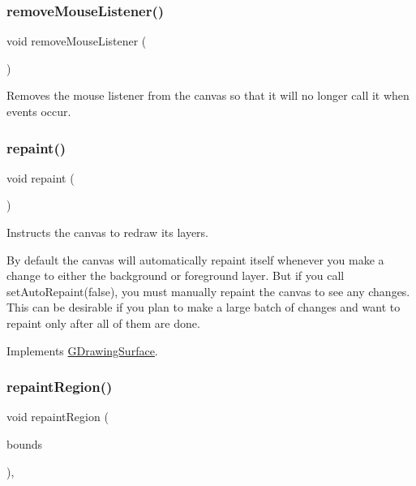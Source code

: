 \subsubsection{\texorpdfstring{remove\+Mouse\+Listener()}{removeMouseListener()}}
{\footnotesize\ttfamily void remove\+Mouse\+Listener (\begin{DoxyParamCaption}{ }\end{DoxyParamCaption})\hspace{0.3cm}{\ttfamily [virtual]}}



Removes the mouse listener from the canvas so that it will no longer call it when events occur. 

\mbox{\label{classGCanvas_ab93427f61c64e3db7f2637519aed1c00}} 
\subsubsection{\texorpdfstring{repaint()}{repaint()}}
{\footnotesize\ttfamily void repaint (\begin{DoxyParamCaption}{ }\end{DoxyParamCaption})\hspace{0.3cm}{\ttfamily [virtual]}}



Instructs the canvas to redraw its layers. 

By default the canvas will automatically repaint itself whenever you make a change to either the background or foreground layer. But if you call set\+Auto\+Repaint(false), you must manually repaint the canvas to see any changes. This can be desirable if you plan to make a large batch of changes and want to repaint only after all of them are done. 

Implements \mbox{\hyperlink{classGDrawingSurface_a4a8ae47b42f1e6a41b65d3546df46218}{G\+Drawing\+Surface}}.

\mbox{\label{classGDrawingSurface_a769c46fb3e1004aec76e8b0adfa42aa6}} 
\subsubsection{\texorpdfstring{repaint\+Region()}{repaintRegion()}\hspace{0.1cm}{\footnotesize\ttfamily [1/2]}}
{\footnotesize\ttfamily void repaint\+Region (\begin{DoxyParamCaption}\item[{const \mbox{\hyperlink{classGRectangle}{G\+Rectangle}} \&}]{bounds }\end{DoxyParamCaption})\hspace{0.3cm}{\ttfamily [virtual]}, {\ttfamily [inherited]}}



